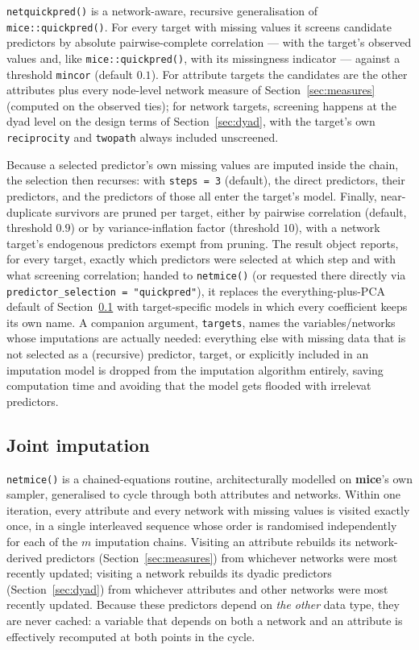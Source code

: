 \documentclass[11pt,a4paper]{article}
\newcommand{\pkg}[1]{\textbf{#1}}
\newcommand{\code}[1]{\texttt{#1}}
\begin{document}
\code{netquickpred()} is a network-aware, recursive generalisation of
\code{mice::quickpred()}. For every target with missing values it screens
candidate predictors by absolute pairwise-complete correlation --- with the
target's observed values and, like \code{mice::quickpred()}, with its missingness
indicator --- against a threshold \code{mincor} (default $0.1$). For
attribute targets the candidates are the other attributes plus every
node-level network measure of Section~\ref{sec:measures} (computed on the
observed ties); for network targets, screening happens at the dyad level on
the design terms of Section~\ref{sec:dyad}, with the target's own
\code{reciprocity} and \code{twopath} always included unscreened.

Because a
selected predictor's own missing values are imputed inside the chain, the
selection then recurses: with \code{steps = 3} (default), the direct
predictors, their predictors, and the predictors of those all enter the
target's model. Finally, near-duplicate survivors are pruned
per target, either by pairwise correlation (default, threshold $0.9$) or by
variance-inflation factor (threshold $10$), with a network target's
endogenous predictors exempt from pruning. The result
object reports, for every target, exactly which predictors were selected at
which step and with what screening correlation; handed to \code{netmice()}
(or requested there directly via \code{predictor\_selection =
"quickpred"}), it replaces the everything-plus-PCA default of
Section~\ref{sec:netmice} with target-specific models in which every
coefficient keeps its own name. A companion argument, \code{targets}, names
the variables/networks whose imputations are actually needed: everything
else with missing data that is not selected as a (recursive) predictor, target, or explicitly included in an imputation model is
dropped from the imputation algorithm entirely, saving computation time and avoiding that the model gets flooded with irrelevat predictors.

\subsection{Joint imputation}
\label{sec:netmice}

\code{netmice()} is a chained-equations routine, architecturally modelled on
\pkg{mice}'s own sampler, generalised to cycle through both attributes and
networks. Within one iteration, every attribute and every network with
missing values is visited exactly once, in a single interleaved sequence
whose order is randomised independently for each of the $m$ imputation
chains. Visiting an attribute rebuilds its network-derived predictors
(Section~\ref{sec:measures}) from whichever networks were most recently
updated; visiting a network rebuilds its dyadic predictors
(Section~\ref{sec:dyad}) from whichever attributes and other networks were
most recently updated. Because these predictors depend on \emph{the other}
data type, they are never cached: a variable that depends on both a network
and an attribute is effectively recomputed at both points in the cycle.
\end{document}
